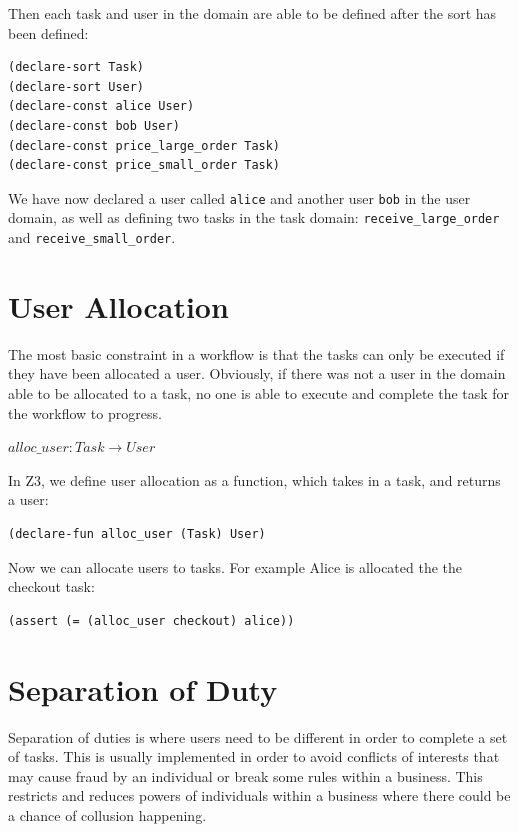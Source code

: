 \documentclass[a4paper]{report}
\begin{document}
Then each task and user in the domain are able to be defined after the sort has been defined: 
\lstset{showspaces=false,
    showstringspaces=false, tabsize=2, breaklines=true,
    xleftmargin=5.0ex,
}
\lstset{basicstyle=\ttfamily}
\begin{lstlisting}[frame=single]
(declare-sort Task)
(declare-sort User)
(declare-const alice User)
(declare-const bob User)
(declare-const price_large_order Task)
(declare-const price_small_order Task)
\end{lstlisting}
We have now declared a user called \texttt{alice} and another user \texttt{bob} in the user domain, as well as defining two tasks in the task domain:  \texttt{receive\_large\_order} and \texttt{receive\_small\_order}. \\

\newpage

\section{User Allocation}
The most basic constraint in a workflow is that the tasks can only be executed if they have been allocated a user. Obviously, if there was not a user in the domain able to be allocated to a task, no one is able to execute and complete the task for the workflow to progress.
\begin{center}
$alloc\_user : Task \rightarrow User$
\end{center}
In Z3, we define user allocation as a function, which takes in a task, and returns a user:
\lstset{showspaces=false,
    showstringspaces=false, tabsize=2, breaklines=true,
    xleftmargin=5.0ex,
}
\begin{lstlisting}[frame=single]
(declare-fun alloc_user (Task) User)
\end{lstlisting}

Now we can allocate users to tasks. For example Alice is allocated the the checkout task:
\lstset{showspaces=false,
    showstringspaces=false, tabsize=2, breaklines=true,
    xleftmargin=5.0ex,
}
\begin{lstlisting}[frame=single]
(assert (= (alloc_user checkout) alice))
\end{lstlisting}

\section{Separation of Duty}
Separation of duties\cite{sod} is where users need to be different in order to complete a set of tasks. This is usually implemented in order to avoid conflicts of interests that may cause fraud by an individual or break some rules within a business. This restricts and reduces powers of individuals within a business where there could be a chance of collusion happening. \\
\end{document}
